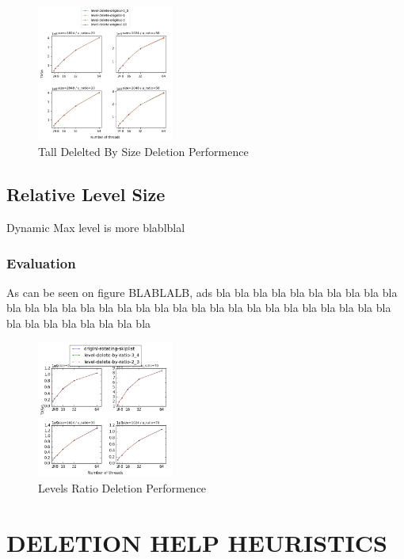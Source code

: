 \documentclass{article}
\begin{document}
\begin{figure}
	\caption{Tall Delelted By Size Deletion Performence}
	\centering
	\includegraphics[width=0.4\textwidth]{level-delete-original_plot}
\end{figure}

\subsection{Relative Level Size}
\label{ssec:rls}

Dynamic Max level is more blablblal

\subsubsection{Evaluation}
\label{sssec:rls-evl}

As can be seen on figure BLABLALB, ads
bla bla bla bla bla bla
bla bla bla bla bla 
bla bla bla bla bla bla
bla bla bla bla bla 
bla bla bla bla bla bla
bla bla bla bla bla 
bla bla bla bla bla bla

\begin{figure}
	\caption{Levels Ratio Deletion Performence}
	\centering
	\includegraphics[width=0.4\textwidth]{level-delete-by-ratio_plot}
\end{figure}


\section{DELETION HELP HEURISTICS}
\label{sec:dhh}
\end{document}
